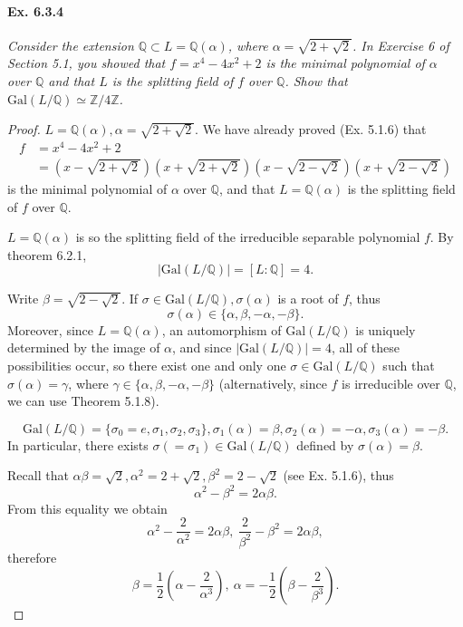 \documentclass[11pt,a4paper]{article}
\newcommand{\Q}{\mathbb{Q}}
\newcommand{\Z}{\mathbb{Z}}
\newcommand{\Gal}{\mathrm{Gal}}
\begin{document}
\paragraph{Ex. 6.3.4}

{\it Consider the extension $\Q\subset L = \Q(\alpha)$, where $\alpha = \sqrt{2+\sqrt{2}}$. In Exercise 6 of Section 5.1, you showed that $f = x^4 - 4x^2+2$ is the minimal polynomial of $\alpha$ over $\Q$ and that $L$ is the splitting field of $f$ over $\Q$. Show that $\Gal(L/\Q) \simeq \Z/4\Z$.
}

\begin{proof}
$L = \Q(\alpha), \alpha= \sqrt{2+\sqrt{2}}$.
We have already proved (Ex. 5.1.6) that
\begin{align*}
f&= x^4-4x^2+2\\
&= \left(x-\sqrt{2+\sqrt{2}}\right)\left(x+\sqrt{2+\sqrt{2}}\right)\left(x-\sqrt{2-\sqrt{2}}\right)\left(x+\sqrt{2-\sqrt{2}}\right)
\end{align*}
is the minimal polynomial of $\alpha$ over $\Q$, and that $L = \Q(\alpha)$ is the splitting field of $f$ over $\Q$.

$L =\Q(\alpha)$ is so the splitting field of the irreducible separable polynomial $f$. By theorem 6.2.1,
$$\vert \Gal(L/\Q) \vert =[L:\Q] = 4.$$

Write $\beta = \sqrt{2-\sqrt{2}}$. If $\sigma \in \Gal(L/\Q), \sigma(\alpha)$ is a root of $f$, thus
$$\sigma(\alpha) \in \{\alpha,\beta,-\alpha,-\beta\}.$$
Moreover, since $L = \Q(\alpha)$, an automorphism of $\Gal(L/\Q)$ is uniquely determined by the image of $\alpha$, and since $\vert \Gal(L/\Q) \vert = 4$, all of these possibilities occur, so there exist one and only one $\sigma \in \Gal(L/\Q)$ such that $\sigma(\alpha)= \gamma$, where $\gamma \in \{\alpha,\beta,-\alpha,-\beta\}$ (alternatively, since $f$ is irreducible over $\Q$, we can use Theorem 5.1.8).

$$ \Gal(L/\Q) = \{\sigma_0 = e,\sigma_1,\sigma_2,\sigma_3\} ,\sigma_1(\alpha) = \beta, \sigma_2(\alpha) = -\alpha,\sigma_3(\alpha) = -\beta.$$
In particular, there exists $\sigma (= \sigma_1) \in \Gal(L/\Q)$ defined by 
$\sigma(\alpha) = \beta$.

Recall that $\alpha \beta= \sqrt{2}, \alpha^2 = 2+\sqrt{2}, \beta^2 = 2-\sqrt{2}$ (see Ex. 5.1.6), thus
$$\alpha^2 - \beta^2 = 2\alpha \beta.$$
From this equality we obtain
$$\alpha^2 - \frac{2}{\alpha^2} = 2 \alpha \beta,\ \frac{2}{\beta^2} - \beta^2 = 2\alpha \beta,$$
therefore
$$\beta = \frac{1}{2}\left(\alpha - \frac{2}{\alpha^3}\right),\ \alpha =  -\frac{1}{2}\left(\beta - \frac{2}{\beta^3}\right).$$



\end{proof}
\end{document}

